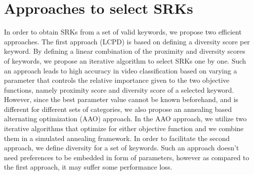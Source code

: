 \section{Approaches to select SRKs}
\label{sec:selectionSRK}

In order to obtain SRKs from a set of valid keywords, we propose two efficient approaches. The first approach (LCPD) is based on defining a diversity score per keyword. By defining a linear combination of the proximity and diversity scores of keywords, we propose an iterative algorithm to select SRKs one by one. Such an approach leads to high accuracy in video classification based on varying a parameter that controls the relative importance given to the two objective functions, namely proximity score and diversity score of a selected keyword. However, since the best parameter value cannot be known beforehand, and is different for different sets of categories, we also propose an annealing based alternating optimization (AAO) approach. In the AAO approach, we utilize two iterative algorithms that optimize for either objective function and we combine them in a simulated annealing framework. In order to facilitate the second approach, we define diversity for a set of keywords. Such an approach doesn't need preferences to be embedded in form of parameters, however as compared to the first approach, it may suffer some performance loss. 

